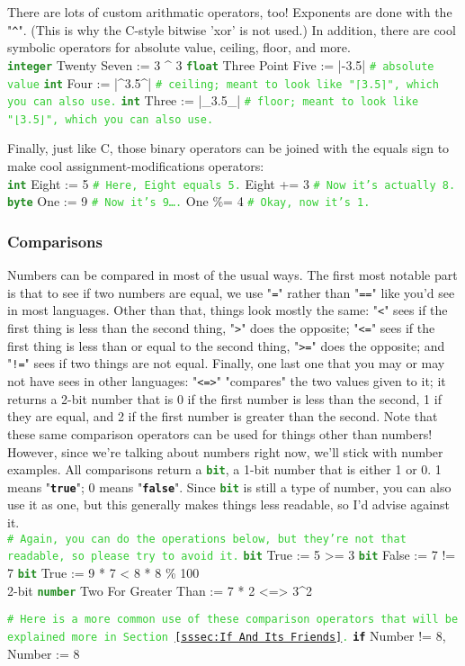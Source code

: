 \documentclass{article}
\newcommand{\sssecl}[1]{\subsubsection{#1}\label{sssec:#1}}
\newcommand{\codecomment}[1]{\texttt{\textcolor{LimeGreen}{#1}}}
\newcommand{\commentline}[1]{\codecomment{\# #1}}
\newcommand{\type}[1]{\texttt{\textcolor{ForestGreen}{\textbf{#1}}}}
\newcommand{\common}[1]{\texttt{\textcolor{Mulberry}{\textbf{#1}}}}
\newenvironment{code}[0]
{\ttfamily{}				%
\setlength\parindent{0cm}	%
~\\}
{\setlength\parindent{1cm}
~\\}
\begin{document}
\indent There are lots of custom arithmatic operators, too! Exponents are done with the "\texttt{\^}". (This is why the C-style bitwise 'xor' is not used.) In addition, there are cool symbolic operators for absolute value, ceiling, floor, and more.
\begin{code}
\type{integer} Twenty Seven := 3 \^{} 3
\type{float} Three Point Five := |-3.5|	\commentline{absolute value}
\type{int} Four := |\^{}3.5\^{}| \commentline{ceiling; meant to look like "⌈3.5⌉", which you can also use.}
\type{int} Three := |\_3.5\_| \commentline{floor; meant to look like "⌊3.5⌋", which you can also use.}
\end{code}

\indent Finally, just like C, those binary operators can be joined with the equals sign to make cool assignment-modifications operators:
\begin{code}
\type{int} Eight := 5	\commentline{Here, Eight equals 5.}
Eight += 3	\commentline{Now it's actually 8.}
\\
\type{byte} One := 9	\commentline{Now it's 9\ldots.}
One \%= 4	\commentline{Okay, now it's 1.}
\end{code}

\sssecl{Comparisons}
\indent Numbers can be compared in most of the usual ways. The first most notable part is that to see if two numbers are equal, we use "\texttt{=}" rather than "\texttt{==}" like you'd see in most languages. Other than that, things look mostly the same: "\texttt{<}" sees if the first thing is less than the second thing, "\texttt{>}" does the opposite; "\texttt{<=}" sees if the first thing is less than or equal to the second thing, "\texttt{>=}" does the opposite; and "\texttt{!=}" sees if two things are not equal. Finally, one last one that you may or may not have sees in other languages: "\texttt{<=>}" "compares" the two values given to it; it returns a 2-bit number that is 0 if the first number is less than the second, 1 if they are equal, and 2 if the first number is greater than the second. Note that these same comparison operators can be used for things other than numbers! However, since we're talking about numbers right now, we'll stick with number examples.
\indent All comparisons return a \type{bit}, a 1-bit number that is either 1 or 0. 1 means "\common{true}"; 0 means "\common{false}". Since \type{bit} is still a type of number, you can also use it as one, but this generally makes things less readable, so I'd advise against it.
\begin{code}
\commentline{Again, you can do the operations below, but they're not that readable, so please try to avoid it.}
\type{bit} True := 5 >= 3
\type{bit} False := 7 != 7
\type{bit} True := 9 * 7 < 8 * 8 \% 100\\
2-bit \type{number} Two For Greater Than := 7 * 2 <=> 3^2

\commentline{Here is a more common use of these comparison operators that will be explained more in Section \ref{sssec:If And Its Friends}.}
\common{if} Number != 8,
	Number := 8
\end{code}
\end{document}
